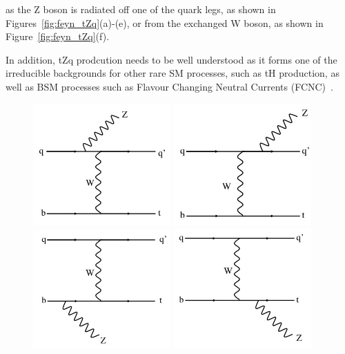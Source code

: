  as the Z boson is radiated off one of the quark legs, as shown in Figures~\ref{fig:feyn_tZq}(a)-(e), or from the exchanged W boson, as shown in Figure~\ref{fig:feyn_tZq}(f).


In addition, tZq prodcution needs to be well understood as it forms one of the irreducible backgrounds for other rare SM processes, such as tH production, as well as BSM processes such as Flavour Changing Neutral Currents (FCNC)~\cite{AguilarSaavedra:2004wm}.

\begin{figure}[htbp]
\centering
\includegraphics[width=0.47\textwidth]{figs/top-physics/tZq_feyn1.jpg}
\includegraphics[width=0.47\textwidth]{figs/top-physics/tZq_feyn2.jpg}
\includegraphics[width=0.47\textwidth]{figs/top-physics/tZq_feyn3.jpg}
\includegraphics[width=0.47\textwidth]{figs/top-physics/tZq_feyn4.jpg}

\end{figure}
